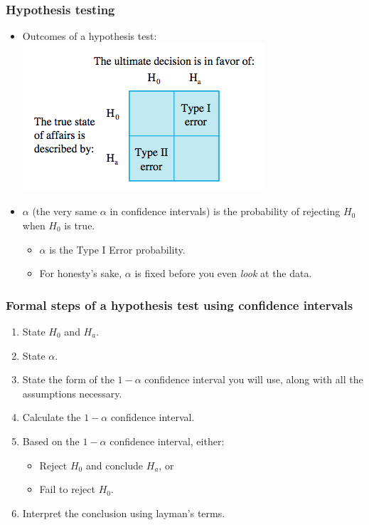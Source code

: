 \documentclass[handout]{beamer}\usepackage[]{graphicx}\usepackage[]{color}
\providecommand{\q}{$\quad$ \newline}
\numberwithin{equation}{section}
\begin{document}
\begin{frame}
\frametitle{Hypothesis testing}
\begin{itemize}
\item Outcomes of a hypothesis test: \q
{} \includegraphics{../../fig/typeerrors.png}
\pause \item $\alpha$ (the very same $\alpha$ in confidence intervals) is the probability of rejecting $H_0$ when $H_0$ is true.
\begin{itemize}
\pause \item $\alpha$ is the Type I Error probability.
\pause \item For honesty's sake, $\alpha$ is fixed before you even \emph{look} at the data.
\end{itemize} 
\end{itemize}
\end{frame}

\begin{frame}
\frametitle{Formal steps of a hypothesis test using confidence intervals}
\begin{enumerate}[1. ]
\item State $H_0$ and $H_a$.
\pause \item State $\alpha$.
\pause \item State the form of the $1 - \alpha$ confidence interval you will use, along with all the assumptions necessary.
\pause \item Calculate the $1 - \alpha$ confidence interval.
\pause \item Based on the $1 - \alpha$ confidence interval, either:
\begin{itemize}
\pause \item Reject $H_0$ and conclude $H_a$, or
\pause \item Fail to reject $H_0$.
\end{itemize}
\pause \item Interpret the conclusion using layman's terms.
\end{enumerate}
\end{frame}
\end{document}
